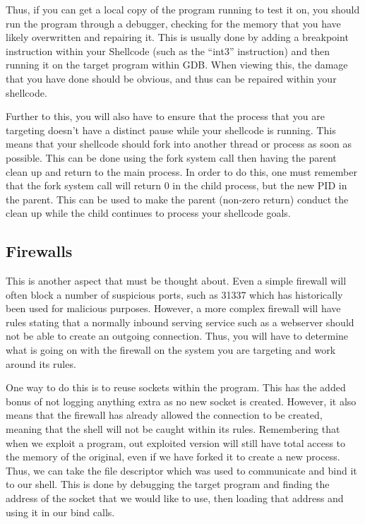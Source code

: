\documentclass[a4paper,11pt]{report}
\begin{document}
			Thus, if you can get a local copy of the program running to test it on, you should run the program through a debugger, checking for the memory that you have likely overwritten and repairing it. 
			This is usually done by adding a breakpoint instruction within your Shellcode (such as the ``int3'' instruction) and then running it on the target program within GDB. 
			When viewing this, the damage that you have done should be obvious, and thus can be repaired within your shellcode. 

			Further to this, you will also have to ensure that the process that you are targeting doesn't have a distinct pause while your shellcode is running. 
			This means that your shellcode should fork into another thread or process as soon as possible. 
			This can be done using the fork system call then having the parent clean up and return to the main process. 
			In order to do this, one must remember that the fork system call will return 0 in the child process, but the new PID in the parent. 
			This can be used to make the parent (non-zero return) conduct the clean up while the child continues to process your shellcode goals. 
			\begin{code}
				Assembler}]{./forkShellcode.asm}
				\caption{Shellcode that forks such that the original thread can continue. }
				\label{code:ForkShellCode}
			\end{code}

		\subsection{Firewalls}
			This is another aspect that must be thought about. 
			Even a simple firewall will often block a number of suspicious ports, such as 31337 which has historically been used for malicious purposes. 
			However, a more complex firewall will have rules stating that a normally inbound serving service such as a webserver should not be able to create an outgoing connection. 
			Thus, you will have to determine what is going on with the firewall on the system you are targeting and work around its rules. 

			One way to do this is to reuse sockets within the program. 
			This has the added bonus of not logging anything extra as no new socket is created. 
			However, it also means that the firewall has already allowed the connection to be created, meaning that the shell will not be caught within its rules. 
			Remembering that when we exploit a program, out exploited version will still have total access to the memory of the original, even if we have forked it to create a new process. 
			Thus, we can take the file descriptor which was used to communicate and bind it to our shell. 
			This is done by debugging the target program and finding the address of the socket that we would like to use, then loading that address and using it in our bind calls. 
\end{document}
